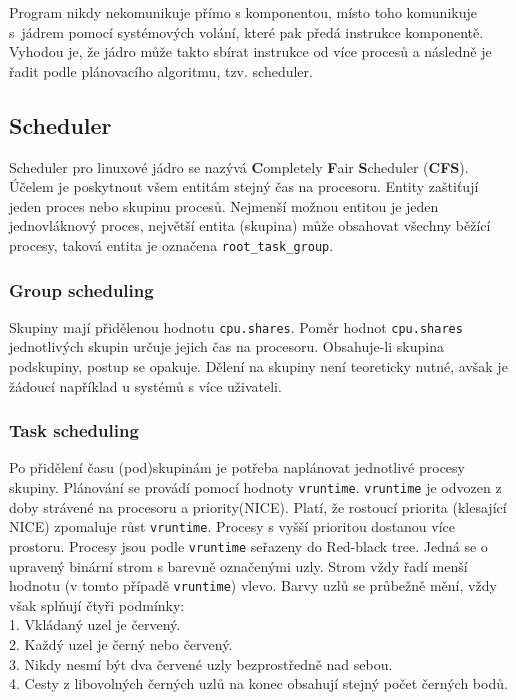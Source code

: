 \documentclass[12pt,a4paper,twoside,]{article}
\begin{document}
{{{{{{{Program nikdy nekomunikuje přímo s komponentou, místo toho komunikuje s~jádrem pomocí systémových volání, které pak předá instrukce komponentě. Vyhodou je, že jádro může takto sbírat instrukce od více procesů a následně je řadit podle plánovacího algoritmu, tzv. scheduler.

\subsection{\textsf{Scheduler}}
Scheduler pro linuxové jádro se nazývá {\bf C}ompletely {\bf F}air {\bf S}cheduler ({\bf CFS}). Účelem je poskytnout všem entitám stejný čas na procesoru. Entity zaštiťují jeden proces nebo skupinu procesů. Nejmenší možnou entitou je jeden jednovláknový proces, největší entita (skupina) může obsahovat všechny běžící procesy, taková entita je označena \texttt{root\_task\_group}. 
\subsubsection{\textsf{Group scheduling}}
Skupiny mají přidělenou hodnotu \texttt{cpu.shares}. Poměr hodnot \texttt{cpu.shares} jednotlivých skupin určuje jejich čas na procesoru. Obsahuje-li skupina podskupiny, postup se opakuje. Dělení na skupiny není teoreticky nutné, avšak je žádoucí například u systémů s více uživateli.

\subsubsection{\textsf{Task scheduling}}
Po přidělení času (pod)skupinám je potřeba naplánovat jednotlivé procesy skupiny. Plánování se provádí pomocí hodnoty \texttt{vruntime}. \texttt{vruntime} je odvozen z doby strávené na procesoru a priority(NICE). Platí, že rostoucí priorita (klesající NICE) zpomaluje růst \texttt{vruntime}. Procesy s vyšší prioritou dostanou více prostoru. Procesy jsou podle \texttt{vruntime} seřazeny do Red-black tree. Jedná se o upravený binární strom s barevně označenými uzly. Strom vždy řadí menší hodnotu (v tomto případě \texttt{vruntime}) vlevo. Barvy uzlů se průbežně mění, vždy však splňují čtyři podmínky:\\
1. Vkládaný uzel je červený.\\2. Každý uzel je černý nebo červený.\\3. Nikdy nesmí být dva červené uzly bezprostředně nad sebou.\\4. Cesty z libovolných černých uzlů na konec obsahují stejný počet černých bodů. \\ 

}}}}}}}
\end{document}
